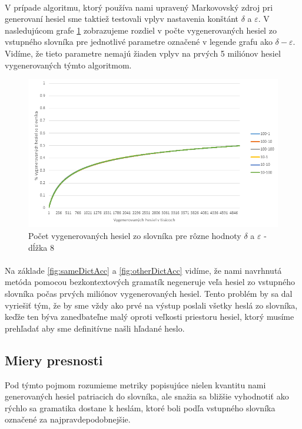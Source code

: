 \paragraph{}
V prípade algoritmu, ktorý používa nami upravený Markovovský zdroj pri generovaní hesiel sme taktiež testovali vplyv nastavenia konštánt \(\delta\) a \(\varepsilon\). V nasledujúcom grafe \ref{fig:MarkovV2} zobrazujeme rozdiel v počte vygenerovaných hesiel zo vstupného slovníka pre jednotlivé parametre označené v legende grafu ako \(\delta-\varepsilon\). Vidíme, že tieto parametre nemajú žiaden vplyv na prvých 5 miliónov hesiel vygenerovaných týmto algoritmom.

\begin{figure}[ht]
    \centering
    \includegraphics[width=1\textwidth]{sameDictAccMarkv2}
    \caption{Počet vygenerovaných hesiel zo slovníka pre rôzne hodnoty \(\delta\) a \(\varepsilon\) - dĺžka 8}
    \label{fig:MarkovV2}
\end{figure}

\paragraph{}
Na základe \ref{fig:sameDictAcc} a \ref{fig:otherDictAcc} vidíme, že nami navrhnutá metóda pomocou bezkontextových gramatík negeneruje veľa hesiel zo vstupného slovníka počas prvých miliónov vygenerovaných hesiel. Tento problém by sa dal vyriešiť tým, že by sme vždy ako prvé na výstup poslali všetky heslá zo slovníka, keďže ten býva zanedbateľne malý oproti veľkosti priestoru hesiel, ktorý musíme prehľadať aby sme definitívne našli hľadané heslo.

\subsection{Miery presnosti}
Pod týmto pojmom rozumieme metriky popisujúce nielen kvantitu nami generovaných hesiel patriacich do slovníka, ale snažia sa bližšie vyhodnotiť ako rýchlo sa gramatika dostane k heslám, ktoré boli podľa vstupného slovníka označené za najpravdepodobnejšie.

